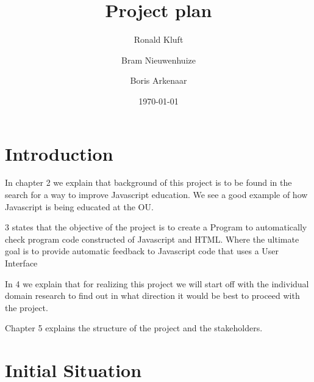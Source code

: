 \documentclass{article}
\begin{document}
\title{Project plan}
\author{Ronald Kluft \and Bram Nieuwenhuize \and Boris Arkenaar}
\date{\today}
\maketitle

\section{Introduction}


In chapter 2 we explain that background of this project is to be found in the search for a way to improve Javascript education. We see a good example of how Javascript is being educated at the OU.

3 states that the objective of the project is to create a Program to automatically check program code constructed of Javascript and HTML.
Where the ultimate goal is to provide automatic feedback to Javascript code that uses a User Interface

In 4 we explain that for realizing this project we will start off with the individual domain research to find out in what direction it would be best to proceed with the project.

Chapter 5 explains the structure of the project and the stakeholders.

\section{Initial Situation}
\end{document}
